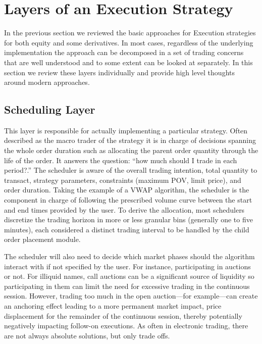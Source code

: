 \section{Layers of an Execution Strategy}

In the previous section we reviewed the basic approaches for Execution strategies for both equity and some derivatives. In most cases, regardless of the underlying implementation the approach can be decomposed in a set of trading concerns that are well understood and to some extent can be looked at separately. In this section we review these layers individually and provide high level thoughts around modern approaches.



\subsection{Scheduling Layer}

This layer is responsible for actually implementing a particular strategy. Often described as the macro trader of the strategy it is in charge of decisions spanning the whole order duration such as allocating the parent order quantity through the life of the order. It answers the question: ``how much should I trade in each period?.'' The scheduler is aware of the overall trading intention, total quantity to transact, strategy parameters, constraints (maximum POV, limit price), and order duration. Taking the example of a VWAP algorithm, the scheduler is the component in charge of following the prescribed volume curve between the start and end times provided by the user. To derive the allocation, most schedulers discretize the trading horizon in more or less granular bins (generally one to five minutes), each considered a distinct trading interval to be handled by the child order placement module.


The scheduler will also need to decide which market phases should the algorithm interact with if not specified by the user. For instance, participating in auctions or not. For illiquid names, call auctions can be a significant source of liquidity so participating in them can limit the need for excessive trading in the continuous session. However, trading too much in the open auction---for example---can create an anchoring effect leading to a more permanent market impact, price displacement for the remainder of the continuous session, thereby potentially negatively impacting follow-on executions. As often in electronic trading, there are not always absolute solutions, but only trade offs.


